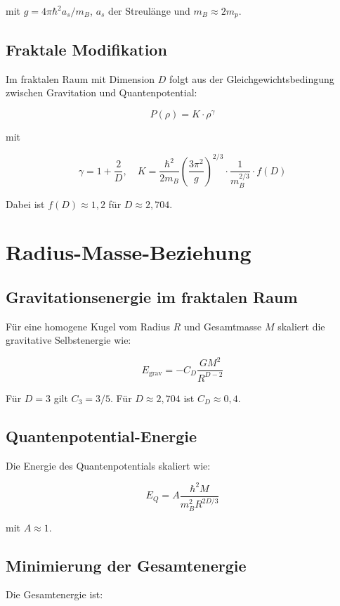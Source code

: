 mit \( g = 4\pi\hbar^2 a_s / m_B \), \( a_s \) der Streulänge und 
\( m_B \approx 2m_p \).

\subsection{Fraktale Modifikation}

Im fraktalen Raum mit Dimension \( D \) folgt aus der Gleichgewichtsbedingung 
zwischen Gravitation und Quantenpotential:

\[
P(\rho) = K \cdot \rho^{\gamma} \tag{L.7}
\]

mit

\[
\gamma = 1 + \frac{2}{D}, \quad 
K = \frac{\hbar^2}{2m_B} \left( \frac{3\pi^2}{g} \right)^{2/3} \cdot 
\frac{1}{m_B^{2/3}} \cdot f(D) \tag{L.8}
\]

Dabei ist \( f(D) \approx 1,2 \) für \( D \approx 2,704 \).

\section{Radius-Masse-Beziehung}

\subsection{Gravitationsenergie im fraktalen Raum}

Für eine homogene Kugel vom Radius \( R \) und Gesamtmasse \( M \) 
skaliert die gravitative Selbstenergie wie:

\[
E_{\text{grav}} = -C_D \frac{GM^2}{R^{D-2}} \tag{L.9}
\]

Für \( D = 3 \) gilt \( C_3 = 3/5 \). Für \( D \approx 2,704 \) ist 
\( C_D \approx 0,4 \).

\subsection{Quantenpotential-Energie}

Die Energie des Quantenpotentials skaliert wie:

\[
E_Q = A \frac{\hbar^2 M}{m_B^2 R^{2D/3}} \tag{L.10}
\]

mit \( A \approx 1 \).

\subsection{Minimierung der Gesamtenergie}

Die Gesamtenergie ist:

